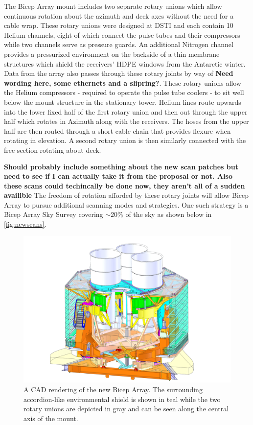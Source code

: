 \documentclass[]{spie}  %
\begin{document}
The Bicep Array mount includes two separate rotary unions which allow
continuous rotation about the azimuth and deck axes without the need for a
cable wrap. These rotary unions were designed at DSTI and each contain 10
Helium channels, eight of which connect the pulse tubes and their compressors
while two channels serve as pressure guards. An additional Nitrogen channel
provides a pressurized environment on the backside of a thin membrane
structures which shield the receivers' HDPE windows from the Antarctic winter.
Data from the array also passes through these rotary joints by way of
\textbf{Need wording here, some ethernets and a slipring?}. These rotary
unions allow the Helium compressors - required to operate the
pulse tube coolers - to sit well below the mount structure in the
stationary tower. Helium lines route upwards into the lower fixed half of the first
rotary union and then out through the upper half which rotates in Azimuth
along with the receivers. The hoses from the upper half are then routed through a
short cable chain that provides flexure when rotating in elevation. A
second rotary union is then similarly connected with the free section rotating
about deck. 


\textbf{Should probably include something about the new scan patches but need
to see if I can actually take it from the proposal or not. Also these scans
could techincally be done now, they aren't all of a sudden availible}
The freedom of rotation afforded by these rotary joints will allow
Bicep Array to pursue additional scanning modes and strategies. One such
strategy is a Bicep Array Sky Survey covering $\sim20\%$ of the sky as
shown below in \ref{fig:newscans}.

\begin{figure} [hb]
	\begin{center}
		\includegraphics[scale=0.4]{BA_mount_isosection.JPG}
	\end{center}
	\caption{A CAD rendering of the new Bicep Array. The surrounding
	accordion-like environmental shield is shown in teal while the two rotary
	unions are depicted in gray and can be seen along the central axis of the
	mount.}
	\label{fig:bamount}
\end{figure}



\end{document}
